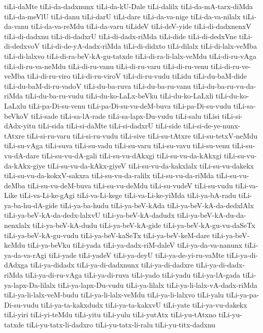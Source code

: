 {tiLi-daMte
tiLi-da-dadxnunx
tiLi-da-kU-Dale
tiLi-dalilx
tiLi-da-mA-tarx-diMda
tiLi-da-meVlU
tiLi-danu
tiLi-darU
tiLi-dare
tiLi-da-va-nige
tiLi-da-va-nilalx
tiLi-da-vanu
tiLi-da-va-reMdu
tiLi-da-varu
tiLideV
tiLi-deV-yide
tiLi-di-dadxnenxV
tiLi-di-dadxnu
tiLi-di-dadxrU
tiLi-di-dadx-riMda
tiLi-dide
tiLi-di-dedxVne
tiLi-di-dedxvoV
tiLi-di-de-yA-dadx-riMda
tiLi-di-didxto
tiLi-dilalx
tiLi-di-lalx-veMba
tiLi-di-lalxvo
tiLi-di-ra-beV-kA-gu-tatxde
tiLi-di-ra-li-lalx-veMdu
tiLi-di-ru-vAga
tiLi-di-ru-va-neMdu
tiLi-di-ru-vanu
tiLi-di-ru-varu
tiLi-di-ru-venu
tiLi-di-ru-ve-veMba
tiLi-di-ru-viro
tiLi-di-ru-viroV
tiLi-di-ru-vudu
tiLidu
tiLi-du-baM-dide
tiLi-du-baM-di-ru-vadoV
tiLi-du-ba-ruva
tiLi-du-ba-ru-vanu
tiLi-du-ba-ru-vu-da-riMda
tiLi-du-ba-ru-vudu
tiLi-du-ko-LaLx-beVku
tiLi-du-ko-LaLxli
tiLi-du-ko-LaLxlu
tiLi-pa-Di-su-venu
tiLi-pa-Di-su-vu-deM-buva
tiLi-pa-Di-su-vudu
tiLi-sa-beVkoV
tiLi-sade
tiLi-sa-lA-rade
tiLi-sa-lapx-Du-vudu
tiLi-salu
tiLisi
tiLi-si-dAdx-yitu
tiLi-sida
tiLi-si-daMte
tiLi-si-dadxrU
tiLi-side
tiLi-si-de-ye-nunx-tAtxre
tiLi-si-ru-varu
tiLi-si-ru-vudu
tiLi-sive
tiLi-su-tAtxre
tiLi-su-tetxV-neMdu
tiLi-su-vAga
tiLi-suva
tiLi-su-vadu
tiLi-su-varu
tiLi-su-vavu
tiLi-su-venu
tiLi-su-vu-dA-dare
tiLi-su-vu-dA-gali
tiLi-su-vu-dAkxgi
tiLi-su-vu-da-kAkxgi
tiLi-su-vu-da-kAkx-giye
tiLi-su-vu-da-kAkx-giyeV
tiLi-su-vu-da-kakxlalx
tiLi-su-vu-dakekx
tiLi-su-vu-da-kokxV-sakxra
tiLi-su-vu-da-ralilx
tiLi-su-vu-da-riMda
tiLi-su-vu-deMba
tiLi-su-vu-deM-buva
tiLi-su-vu-deMdu
tiLi-su-vudeV
tiLi-su-vudu
tiLi-va-Like
tiLi-va-Li-ke-gAgi
tiLi-va-Li-kege
tiLi-va-Li-ke-yiMda
tiLi-ya-bA-radu
tiLi-ya-ba-hu-dA-gide
tiLi-ya-ba-hudu
tiLi-ya-beV-kAda
tiLi-ya-beV-kA-da-dedxlAlx
tiLi-ya-beV-kA-da-dedx-lalxvU
tiLi-ya-beV-kA-dadudx
tiLi-ya-beV-kA-du-da-nenxlalx
tiLi-ya-beV-kA-dudu
tiLi-ya-beV-kA-gide
tiLi-ya-beV-kA-gu-vu-daSeTx
tiLi-ya-beV-kA-gu-vudu
tiLi-ya-beV-kaSeTx
tiLi-ya-beV-keM-dare
tiLi-ya-beV-keMdu
tiLi-ya-beVku
tiLi-yada
tiLi-ya-dadx-riM-daleV
tiLi-ya-da-va-nanunx
tiLi-ya-da-va-rAgi
tiLi-yade
tiLi-yadeV
tiLi-ya-deyU
tiLi-ya-de-yi-ru-vaMte
tiLi-ya-di-dAdxga
tiLi-ya-didadx
tiLi-ya-di-dadxnunx
tiLi-ya-di-dadxre
tiLi-ya-di-dadx-riMda
tiLi-ya-di-ru-vAga
tiLi-ya-di-ruva
tiLi-yado
tiLi-yadu
tiLi-ya-lA-gada
tiLi-ya-lapx-Da-lilalx
tiLi-ya-lapx-Du-vudu
tiLi-ya-lilalx
tiLi-ya-li-lalx-vA-dadx-riMda
tiLi-ya-li-lalx-veM-budu
tiLi-ya-li-lalx-veMdu
tiLi-ya-li-lalxvo
tiLi-yalu
tiLi-ya-pa-Di-su-vudu
tiLi-ya-ta-kakxdudx
tiLi-ya-ta-kakxvU
tiLi-yate
tiLi-ya-vu-dakekx
tiLi-yiri
tiLi-yi-teMdu
tiLi-yitu
tiLi-yulu
tiLi-yutAtx
tiLi-yu-tAtxno
tiLi-yu-tatxde
tiLi-yu-tatx-li-dadxro
tiLi-yu-tatx-li-ralu
tiLi-yu-titx-dadxnu
}
